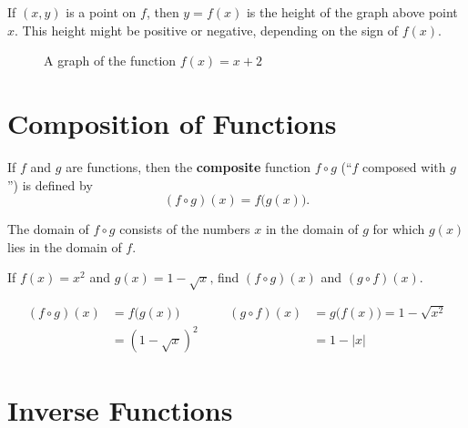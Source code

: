 If \( (x,y) \) is a point on \(f\), then \(y=f(x)\) is the height of the graph above point \(x\).
This height might be positive or negative, depending on the sign of \(f(x)\).
\begin{figure}[H]
    \begin{center}
      \caption{A graph of the function \(f(x)=x+2\)}
    \end{center}
  \end{figure}

\section{Composition of Functions}

\begin{defn}
  If \(f\) and \(g\) are functions, then the \textbf{composite} function \(f \circ g\) (``\(f\) composed with \(g\)'') is defined by
  \[ (f \circ g)(x)=f\bigl(g(x)\bigr) \text{.} \]
  \begin{remark}
    The domain of \( f \circ g \) consists of the numbers \(x\) in the domain of \(g\) for which \(g(x)\) lies in the domain of \(f\).
  \end{remark}
\end{defn}
\begin{ex}
  If
  \(f(x)=x^2\)
  and
  \(g(x)=1-\sqrt{x}\text{,}\)
  find \( (f \circ g)(x) \) and \( (g \circ f)(x)\).
  \begin{sol}
    \begin{align*}
      (f \circ g)(x)
      &=f\big(g(x)\big)
      &&&
      (g \circ f)(x)
      &=g\big(f(x)\big)=1-\sqrt{x^2}
      \\
      &=(1-\sqrt{x})^2
      &&&
      &= 1-|x|
    \end{align*}
  \end{sol}
\end{ex}

\section{Inverse Functions}

